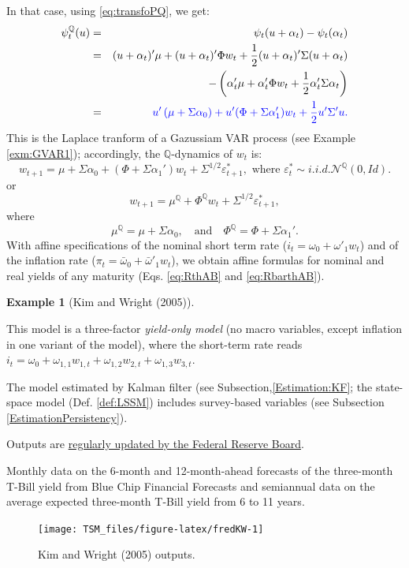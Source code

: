 \documentclass[
  12pt,
]{book}
\theoremstyle{definition}
\theoremstyle{definition}
\newtheorem{example}{Example}[chapter]
\theoremstyle{definition}
\theoremstyle{definition}
\theoremstyle{remark}
\begin{document}
In that case, using \eqref{eq:transfoPQ}, we get:
\begin{eqnarray*}
\psi_t^{\mathbb{Q}}(u) &=& \psi_t(u + \alpha_t) - \psi_t(\alpha_t)\\
&=& (u + \alpha_t)'\mu + (u + \alpha_t)'\Phi w_t + \frac{1}{2}(u + \alpha_t)'\Sigma(u + \alpha_t) \\
&& - \left(\alpha_t'\mu + \alpha_t'\Phi w_t + \frac{1}{2}\alpha_t'\Sigma\alpha_t\right) \\
&=& \color{blue}{u' \left(\mu + \Sigma \alpha_0 \right) + u'(\Phi + \Sigma \alpha_1')w_t  + \frac{1}{2}u'\Sigma'u}.
\end{eqnarray*}
This is the Laplace tranform of a Gazussiam VAR process (see Example \ref{exm:GVAR1}); accordingly, the \(\mathbb{Q}\)-dynamics of \(w_t\) is:
\[
w_{t+1} = \mu + \Sigma  \alpha_0 + (\Phi + \Sigma \alpha_1')  w_{t} + \Sigma^{1/2} \varepsilon^*_{t+1}, \mbox{ where } \varepsilon^*_{t} \sim  i.i.d. \mathcal{N}^{\mathbb{Q}}(0,Id).
\]
or
\begin{equation}
w_{t+1} = \mu^{\mathbb{Q}} + \Phi^{\mathbb{Q}} w_{t} + \Sigma^{1/2} \varepsilon^*_{t+1},\label{eq:GaussianQdyn}
\end{equation}
where
\[
\boxed{\mu^{\mathbb{Q}} = \mu + \Sigma  \alpha_0,\quad \mbox{and} \quad\Phi^{\mathbb{Q}}=\Phi + \Sigma \alpha_1'.}
\]
With affine specifications of the nominal short term rate (\(i_{t} = \omega_0 + \omega'_1 w_t\)) and of the inflation rate (\(\pi_{t} = \bar\omega_0 + \bar\omega'_1 w_t\)), we obtain affine formulas for nominal and real yields of any maturity (Eqs. \eqref{eq:RthAB} and \eqref{eq:RbarthAB}).

\begin{example}[Kim and Wright (2005)]
\protect\hypertarget{exm:KimWright}{}\label{exm:KimWright}

This model is a three-factor \emph{yield-only model} (no macro variables, except inflation in one variant of the model), where the short-term rate reads \(i_t = \omega_0 + \omega_{1,1} w_{1,t} +\omega_{1,2} w_{2,t} +\omega_{1,3} w_{3,t}\).

The model estimated by Kalman filter (see Subsection,\ref{Estimation:KF}; the state-space model (Def. \ref{def:LSSM}) includes survey-based variables (see Subsection \ref{EstimationPersistency}).

Outputs are \href{https://www.federalreserve.gov/pubs/feds/2005/200533/200533abs.html}{regularly updated by the Federal Reserve Board}.

Monthly data on the 6-month and 12-month-ahead forecasts of the three-month T-Bill yield from Blue Chip Financial Forecasts and semiannual data on the average expected three-month T-Bill yield from 6 to 11 years.

\begin{figure}
\texttt{[image: TSM\_files/figure-latex/fredKW-1]} \caption{Kim and Wright (2005) outputs.}\label{fig:fredKW}
\end{figure}

\end{example}
\end{document}
